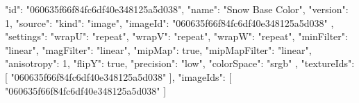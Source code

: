 {
  "id": "060635f66f84fc6df40e348125a5d038",
  "name": "Snow Base Color",
  "version": 1,
  "source": {
    "kind": "image",
    "imageId": "060635f66f84fc6df40e348125a5d038"
  },
  "settings": {
    "wrapU": "repeat",
    "wrapV": "repeat",
    "wrapW": "repeat",
    "minFilter": "linear",
    "magFilter": "linear",
    "mipMap": true,
    "mipMapFilter": "linear",
    "anisotropy": 1,
    "flipY": true,
    "precision": "low",
    "colorSpace": "srgb"
  },
  "textureIds": [
    "060635f66f84fc6df40e348125a5d038"
  ],
  "imageIds": [
    "060635f66f84fc6df40e348125a5d038"
  ]
}
